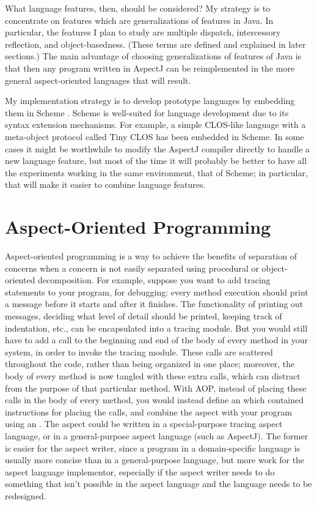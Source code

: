 \documentclass[12pt]{article}
\begin{document}
What language features, then, should be considered?  My strategy is to
concentrate on features which are generalizations of features in Java.
In particular, the features I plan to study are multiple dispatch,
intercessory reflection, and object-basedness.  (These terms are
defined and explained in later sections.)  The main advantage of
choosing generalizations of features of Java is that then any program
written in AspectJ can be reimplemented in the more general
aspect-oriented languages that will result.

My implementation strategy is to develop prototype languages by
embedding them in Scheme \cite{R5RS}.  Scheme is well-suited for
language development due to its syntax extension mechanisms.  For
example, a simple CLOS-like language with a meta-object protocol
\cite{AMOP} called Tiny CLOS \cite{tiny-clos} has been embedded in
Scheme.  In some cases it might be worthwhile to modify the AspectJ
compiler  directly to handle a new language feature, but
most of the time it will probably be better to have all the
experiments working in the same environment, that of Scheme; in
particular, that will make it easier to combine language features.

\section{Aspect-Oriented Programming}


Aspect-oriented programming is a way to achieve the benefits of
separation of concerns when a concern is not easily separated using
procedural or object-oriented decomposition.  For example, suppose you
want to add tracing statements to your program, for debugging: every
method execution should print a message before it starts and after it
finishes.  The functionality of printing out messages, deciding what
level of detail should be printed, keeping track of indentation, etc.,
can be encapsulated into a tracing module.  But you would still have
to add a call to the beginning and end of the body of every method in
your system, in order to invoke the tracing module.  These calls are
scattered throughout the code, rather than being organized in one
place; moreover, the body of every method is now tangled with these
extra calls, which can distract from the purpose of that particular
method.  With AOP, instead of placing these calls in the body of every
method, you would instead define an  which contained
instructions for placing the calls, and combine the aspect with your
program using an .  The aspect could be written in
a special-purpose tracing aspect language, or in a general-purpose
aspect language (such as AspectJ).  The former is easier for the
aspect writer, since a program in a domain-specific language is
usually more concise than in a general-purpose language, but more work
for the aspect language implementor, especially if the aspect writer
needs to do something that isn't possible in the aspect language and
the language needs to be redesigned.
\end{document}
